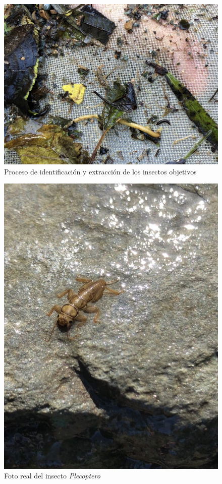 		\begin{figure}[H]
			\centering
				\includegraphics[width=1\textwidth]{imagenes/testAlpha/4.JPG}
					\caption{Proceso de identificación y extracción de los insectos objetivos}
		\end{figure}
		\begin{figure}[H]
			\centering
				\includegraphics[width=1\textwidth]{imagenes/testAlpha/5.JPG}
					\caption{Foto real del insecto \textit{Plecoptero}}
		\end{figure}

